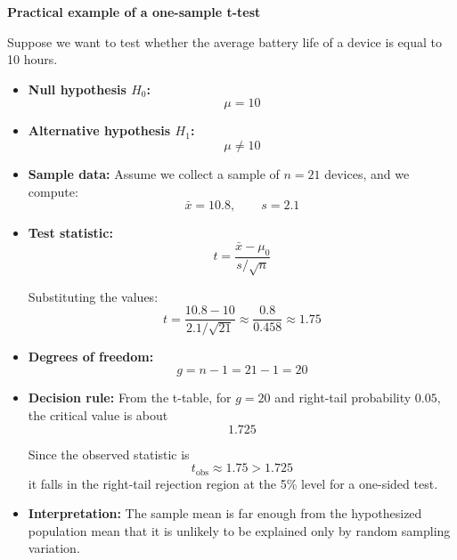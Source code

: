 \begin{example}{\textbf{Practical example of a one-sample t-test}}
    
Suppose we want to test whether the average battery life of a device is equal to 10 hours.

\begin{itemize}
    \item \textbf{Null hypothesis \(H_0\):}
    \[
    \mu = 10
    \]

    \item \textbf{Alternative hypothesis \(H_1\):}
    \[
    \mu \neq 10
    \]

    \item \textbf{Sample data:} Assume we collect a sample of \(n=21\) devices, and we compute:
    \[
    \bar{x}=10.8, \qquad s=2.1
    \]

    \item \textbf{Test statistic:}
    \[
    t=\frac{\bar{x}-\mu_0}{s/\sqrt{n}}
    \]

    Substituting the values:
    \[
    t=\frac{10.8-10}{2.1/\sqrt{21}}
    \approx \frac{0.8}{0.458}
    \approx 1.75
    \]

    \item \textbf{Degrees of freedom:}
    \[
    g=n-1=21-1=20
    \]

    \item \textbf{Decision rule:} From the t-table, for \(g=20\) and right-tail probability \(0.05\), the critical value is about
    \[
    1.725
    \]

    Since the observed statistic is
    \[
    t_{\text{obs}} \approx 1.75 > 1.725
    \]
    it falls in the right-tail rejection region at the 5\% level for a one-sided test.

    \item \textbf{Interpretation:} The sample mean is far enough from the hypothesized population mean that it is unlikely to be explained only by random sampling variation.
\end{itemize}
\end{example}

\vspace{0.3cm}

